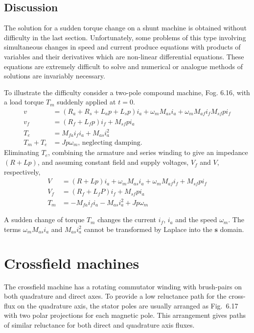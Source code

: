 \documentclass[a4paper,numbers=noenddot,12pt]{scrbook}
\begin{document}
    \subsection{Discussion}
    The solution for a sudden torque change on a shunt machine is obtained without difficulty in the last section. Unfortunately, some problems of this type involving simultaneous changes in speed and current produce equations with products of variables and their derivatives which are non-linear differential equations. These equations are extremely difficult to solve and numerical or analogue methods of solutions are invariably necessary.

    To illustrate the difficulty consider a two-pole compound machine, Fog. 6.16, with a load torque $T_m$ suddenly applied at $t = 0$.
    \begin{equation}
        \begin{aligned}
            v & =(R_a + R_s +L_a p + L_s p)i_a + \omega_m M_{as} i_a + \omega_m M_{af} i_f M_{sf} p i_f \\
            v_f & = (R_f + L_f p)i_f + M_{sf} p i_a \\
            T_e & = M_{fa} i_f i_a + M_{as}i_a^2 \\
            T_m + T_e & = J p \omega_m \text{, neglecting damping.}
        \end{aligned}
        \label{eq:Eq6.74}
    \end{equation}
    Eliminating $T_e$, combining the armature and series winding to give an impedance $(R + Lp)$, and assuming constant field and supply voltages, $V_f$ and $V$, respectively,
    \begin{equation}
        \begin{aligned}
            V & =(R + L p)i_a + \omega_m M_{as} i_a + \omega_m M_{af}i_f + M_{sf} p i_f \\
            V_f & = (R_f +L_f P)i_f + M_{sf} p i_a \\
            T_m & = - M_{fa} i_f i_a - M_{as} i_a^2 + J p \omega_m
        \end{aligned}
        \label{eq:Eq6.75}
    \end{equation}

    A sudden change of torque $T_m$ changes the current $i_f$, $i_a$ and the speed $\omega_m$. The terms $\omega_m M_{as} i_a$ and $M_{as}i_a^2$ cannot be transformed by Laplace into the $\textbf{s}$ domain.

    \section{Crossfield machines}
    The crossfield machine has a rotating commutator winding with brush-pairs on both quadrature and direct axes. To provide a low reluctance path for the cross-flux on the quadrature axis, the stator poles are usually arranged as Fig.\ 6.17 with two polar projections for each magnetic pole. This arrangement gives paths of similar reluctance for both direct and quadrature axis fluxes.
\end{document}
